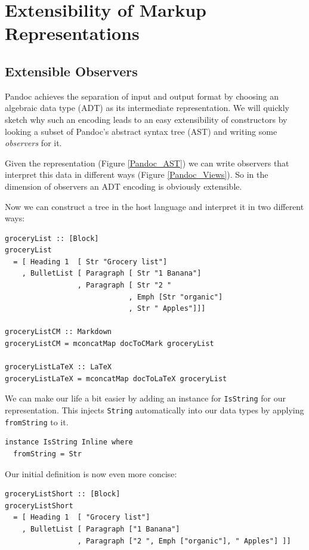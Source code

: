 \section{Extensibility of Markup Representations}
\subsection{Extensible Observers}

Pandoc achieves the separation of input and output format by choosing an
algebraic data type (ADT) as its intermediate representation. We will quickly
sketch why such an encoding leads to an easy extensibility of constructors by
looking a subset of Pandoc's abstract syntax tree (AST) and writing some
\emph{observers} for it.

Given the representation (Figure \ref{Pandoc_AST}) we can write observers that
interpret this data in different ways (Figure \ref{Pandoc_Views}). So in the
dimension of observers an ADT encoding is obviously extensible.

Now we can construct a tree in the host language and interpret it in two
different ways:
\begin{lstlisting}
groceryList :: [Block]
groceryList
  = [ Heading 1  [ Str "Grocery list"]
    , BulletList [ Paragraph [ Str "1 Banana"]
                 , Paragraph [ Str "2 "
                             , Emph [Str "organic"]
                             , Str " Apples"]]]

groceryListCM :: Markdown
groceryListCM = mconcatMap docToCMark groceryList

groceryListLaTeX :: LaTeX
groceryListLaTeX = mconcatMap docToLaTeX groceryList
\end{lstlisting}

We can make our life a bit easier by adding an instance for \texttt{IsString}
for our representation. This injects \texttt{String} automatically into our data
types by applying \texttt{fromString} to it.

\begin{lstlisting}
instance IsString Inline where
  fromString = Str
\end{lstlisting}


Our initial definition is now even more concise:

\begin{lstlisting}
groceryListShort :: [Block]
groceryListShort
  = [ Heading 1  [ "Grocery list"]
    , BulletList [ Paragraph ["1 Banana"]
                 , Paragraph ["2 ", Emph ["organic"], " Apples"] ]]
\end{lstlisting}

